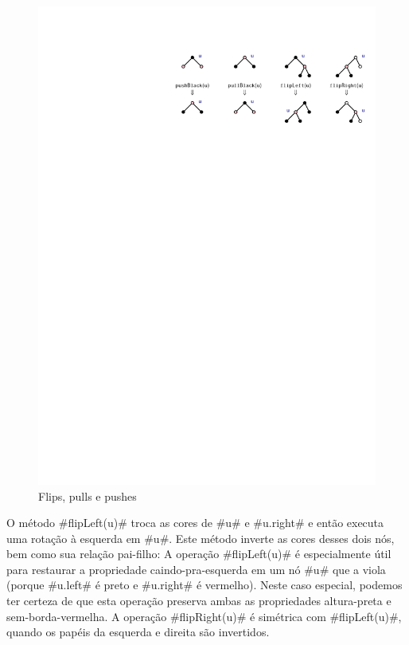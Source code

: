 \begin{figure}
	\begin{center}
		\includegraphics[width=\ScaleIfNeeded]{figs/flippullpush}
	\end{center}
	\caption{Flips, pulls e pushes}
\end{figure}

O método #flipLeft(u)# troca as cores de #u# e #u.right#
e então executa uma rotação à esquerda em #u#. Este método inverte as
cores desses dois nós, bem como sua relação pai-filho:
A operação #flipLeft(u)#
é especialmente útil para restaurar a propriedade caindo-pra-esquerda em um nó
#u# que a viola (porque #u.left# é preto e #u.right# é vermelho).
Neste caso especial, podemos ter certeza de que esta operação preserva ambas
as propriedades altura-preta e sem-borda-vermelha. A operação #flipRight(u)#
é simétrica com #flipLeft(u)#, quando os papéis da esquerda e direita são invertidos.

